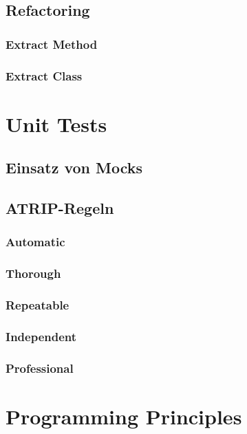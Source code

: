 \documentclass[12pt,a4paper,titlepage,ngerman,pdftex]{report}
\begin{document}
    \subsection{Refactoring}

    \subsubsection{Extract Method}

    \subsubsection{Extract Class}


    \section{Unit Tests}

    \subsection{Einsatz von Mocks}

    \subsection{ATRIP-Regeln}

    \subsubsection{Automatic}

    \subsubsection{Thorough}\label{subsec:thorough}

    \subsubsection{Repeatable}

    \subsubsection{Independent}

    \subsubsection{Professional}

    \section{Programming Principles}
\end{document}
